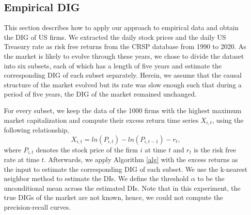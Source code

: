 \subsection{Empirical DIG}

This section describes how to apply our approach to empirical data and obtain the DIG of US firms. 
We extracted the daily stock prices and the daily US Treasury rate as risk free returns from the CRSP database from 1990 to 2020. 
As the market is likely to evolve through these years, 
we chose to divide the dataset into six subsets, each of which has a length of five years and estimate the corresponding DIG of each subset separately. 
Herein, we assume that the causal structure of the market evolved but its rate was slow enough such that during a period of five years, the DIG of the market remained unchanged. 

For every subset, we keep the data of the 1000 firms with the highest maximum market capitalization and compute their excess return time series $X_{i,t}$, using the following relationship,
\begin{equation}
X_{i,t} = ln(P_{i,t}) - ln(P_{i,t-1}) - r_t,  
\end{equation}
where $P_{i,t}$ denotes the stock price of the firm $i$ at time $t$ and $r_{t}$ is the risk free rate at time $t$. 
Afterwards, we apply Algorithm \ref{alg} with the excess returns as the input to estimate the corresponding DIG of each subset. 
We use the k-nearest neighbor method to estimate the DIs.
We define the threshold $\alpha$ to be the unconditional mean across the estimated DIs. Note that in this experiment, the true DIGs of the market are not known, hence, we could not compute the precision-recall curves.

\clearpage

